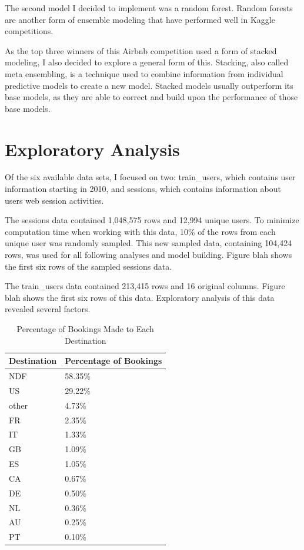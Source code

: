 \documentclass{article}
\begin{document}
The second model I decided to implement was a random forest. Random forests are another form of ensemble 
modeling that have performed well in Kaggle competitions. 

As the top three winners of this Airbnb competition used a form of stacked modeling, I also decided to 
explore a general form of this. Stacking, also called meta ensembling, is a technique used to combine 
information from individual predictive models to create a new model. Stacked models usually outperform 
its base models, as they are able to correct and build upon the performance of those base models. 


\section{Exploratory Analysis}

Of the six available data sets, I focused on two: train\_users, which contains user information starting
in 2010, and sessions, which contains information about user\textquotesingle s web session activities. 

The sessions data contained 1,048,575 rows and 12,994 unique users. To minimize computation time when working 
with this data, 10\% of the rows from each unique user was randomly sampled. This new sampled data, containing 104,424 
rows, was used for all following analyses and model building. Figure blah shows the first six rows of the
sampled sessions data. 

The train\_users data contained 213,415 rows and 16 original columns. Figure blah shows the first six rows 
of this data. Exploratory analysis of this data revealed several factors. 

\begin{table}[ht]
\centering
\begin{tabular}{| l |l |}
  \hline
  \textbf{Destination} & \textbf{Percentage of Bookings} \\ 
  \hline
  NDF & 58.35\% \\ 
  US & 29.22\% \\ 
  other & 4.73\% \\ 
  FR & 2.35\% \\ 
  IT & 1.33\% \\ 
  GB & 1.09\% \\ 
  ES & 1.05\% \\ 
  CA & 0.67\% \\ 
  DE & 0.50\% \\ 
  NL & 0.36\% \\ 
  AU & 0.25\% \\ 
  PT & 0.10\% \\ 
   \hline
\end{tabular}
\caption{Percentage of Bookings Made to Each Destination}
\label{table:countries}
\end{table}
\end{document}
